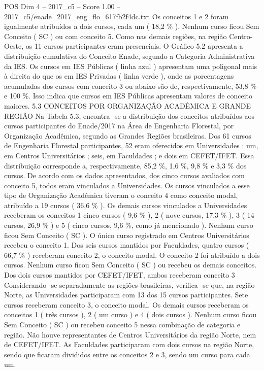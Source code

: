 \begin{textsample}{POS Dim 4 – 2017\_c5 – Score 1.00 – 2017\_c5/enade\_2017\_eng\_flo\_617fb2f4dc.txt}
Os conceitos 1 e 2 foram igualmente atribuídos a dois cursos, cada um ( 18,2 \% ).
Nenhum curso ficou Sem Conceito ( SC ) ou com conceito 5.
Como nas demais regiões, na região Centro-Oeste, os 11 cursos participantes eram presenciais.
O Gráfico 5.2 apresenta a distribuição cumulativa do Conceito Enade, segundo a Categoria Administrativa da IES.
Os cursos em IES Públicas ( linha azul ) apresentam uma poligonal mais à direita do que os em IES Privadas ( linha verde ), onde as porcentagens acumuladas dos cursos com conceito 3 ou abaixo são de, respectivamente, 53,8 \% e 100 \%.
Isso indica que cursos em IES Públicas apresentam valores de conceito maiores. 5.3 CONCEITOS POR ORGANIZAÇÃO ACADÊMICA E GRANDE REGIÃO Na Tabela 5.3, encontra -se a distribuição dos conceitos atribuídos aos cursos participantes do Enade/2017 na Área de Engenharia Florestal, por Organização Acadêmica, segundo as Grandes Regiões brasileiras.
Dos 61 cursos de Engenharia Florestal participantes, 52 eram oferecidos em Universidades : um, em Centros Universitários ; seis, em Faculdades ; e dois em CEFET/IFET.
Essa distribuição corresponde a, respectivamente, 85,2 \%, 1,6 \%, 9,8 \% e 3,3 \% dos cursos.
De acordo com os dados apresentados, dos cinco cursos avaliados com conceito 5, todos eram vinculados a Universidades.
Os cursos vinculados a esse tipo de Organização Acadêmica tiveram o conceito 4 como conceito modal, atribuído a 19 cursos ( 36,6 \% ).
Os demais cursos vinculados a Universidades receberam os conceitos 1 cinco cursos ( 9,6 \% ), 2 ( nove cursos, 17,3 \% ), 3 ( 14 cursos, 26,9 \% ) e 5 ( cinco cursos, 9,6 \%, como já mencionado ).
Nenhum curso ficou Sem Conceito ( SC ).
O único curso registrado em Centros Universitários recebeu o conceito 1.
Dos seis cursos mantidos por Faculdades, quatro cursos ( 66,7 \% ) receberam conceito 2, o conceito modal.
O conceito 2 foi atribuído a dois cursos.
Nenhum curso ficou Sem Conceito ( SC ) ou recebeu os demais conceitos.
Dos dois cursos mantidos por CEFET/IFET, ambos receberam conceito 3 Considerando -se separadamente as regiões brasileiras, verifica -se que, na região Norte, as Universidades participaram com 13 dos 15 cursos participantes.
Sete cursos receberam conceito 3, o conceito modal.
Os demais cursos receberam os conceitos 1 ( três cursos ), 2 ( um curso ) e 4 ( dois cursos ).
Nenhum curso ficou Sem Conceito ( SC ) ou recebeu conceito 5 nessa combinação de categoria e região.
Não houve representantes de Centros Universitários da região Norte, nem de CEFET/IFET.
As Faculdades participaram com dois cursos na região Norte, sendo que ficaram divididos entre os conceitos 2 e 3, sendo um curso para cada um.

\end{textsample}
